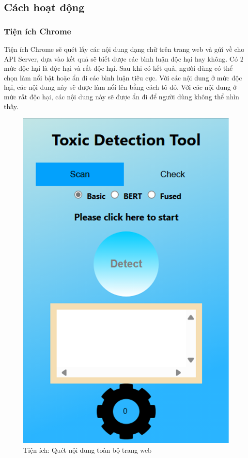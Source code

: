 \subsection{Cách hoạt động}

\subsubsection{Tiện ích Chrome}
Tiện ích Chrome sẽ quét lấy các nội dung dạng chữ trên trang web và gửi về cho API Server, dựa vào kết quả sẽ biết được các bình luận độc hại hay không. Có 2 mức độc hại là độc hại và rất độc hại. Sau khi có kết quả, người dùng có thể chọn làm nổi bật hoặc ẩn đi các bình luận tiêu cực. Với các nội dung ở mức độc hại, các nội dung này sẽ được làm nổi lên bằng cách tô đỏ. Với các nội dung ở mức rất độc hại, các nội dung này sẽ được ẩn đi để người dùng không thể nhìn thấy.

\begin{figure}[htb]
    \centering
    \includegraphics[width=\textwidth]{image/ex_web.png}
    \caption{Tiện ích: Quét nội dung toàn bộ trang web}
    \label{figure:ex_web}
\end{figure}

